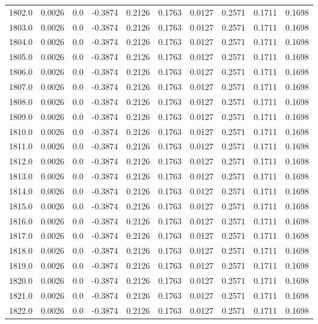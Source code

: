 \begin{longtable}{lrrrrrrrrr}
1802.0 & 0.0026 & 0.0 & -0.3874 & 0.2126 & 0.1763 & 0.0127 & 0.2571 & 0.1711 & 0.1698 \\
1803.0 & 0.0026 & 0.0 & -0.3874 & 0.2126 & 0.1763 & 0.0127 & 0.2571 & 0.1711 & 0.1698 \\
1804.0 & 0.0026 & 0.0 & -0.3874 & 0.2126 & 0.1763 & 0.0127 & 0.2571 & 0.1711 & 0.1698 \\
1805.0 & 0.0026 & 0.0 & -0.3874 & 0.2126 & 0.1763 & 0.0127 & 0.2571 & 0.1711 & 0.1698 \\
1806.0 & 0.0026 & 0.0 & -0.3874 & 0.2126 & 0.1763 & 0.0127 & 0.2571 & 0.1711 & 0.1698 \\
1807.0 & 0.0026 & 0.0 & -0.3874 & 0.2126 & 0.1763 & 0.0127 & 0.2571 & 0.1711 & 0.1698 \\
1808.0 & 0.0026 & 0.0 & -0.3874 & 0.2126 & 0.1763 & 0.0127 & 0.2571 & 0.1711 & 0.1698 \\
1809.0 & 0.0026 & 0.0 & -0.3874 & 0.2126 & 0.1763 & 0.0127 & 0.2571 & 0.1711 & 0.1698 \\
1810.0 & 0.0026 & 0.0 & -0.3874 & 0.2126 & 0.1763 & 0.0127 & 0.2571 & 0.1711 & 0.1698 \\
1811.0 & 0.0026 & 0.0 & -0.3874 & 0.2126 & 0.1763 & 0.0127 & 0.2571 & 0.1711 & 0.1698 \\
1812.0 & 0.0026 & 0.0 & -0.3874 & 0.2126 & 0.1763 & 0.0127 & 0.2571 & 0.1711 & 0.1698 \\
1813.0 & 0.0026 & 0.0 & -0.3874 & 0.2126 & 0.1763 & 0.0127 & 0.2571 & 0.1711 & 0.1698 \\
1814.0 & 0.0026 & 0.0 & -0.3874 & 0.2126 & 0.1763 & 0.0127 & 0.2571 & 0.1711 & 0.1698 \\
1815.0 & 0.0026 & 0.0 & -0.3874 & 0.2126 & 0.1763 & 0.0127 & 0.2571 & 0.1711 & 0.1698 \\
1816.0 & 0.0026 & 0.0 & -0.3874 & 0.2126 & 0.1763 & 0.0127 & 0.2571 & 0.1711 & 0.1698 \\
1817.0 & 0.0026 & 0.0 & -0.3874 & 0.2126 & 0.1763 & 0.0127 & 0.2571 & 0.1711 & 0.1698 \\
1818.0 & 0.0026 & 0.0 & -0.3874 & 0.2126 & 0.1763 & 0.0127 & 0.2571 & 0.1711 & 0.1698 \\
1819.0 & 0.0026 & 0.0 & -0.3874 & 0.2126 & 0.1763 & 0.0127 & 0.2571 & 0.1711 & 0.1698 \\
1820.0 & 0.0026 & 0.0 & -0.3874 & 0.2126 & 0.1763 & 0.0127 & 0.2571 & 0.1711 & 0.1698 \\
1821.0 & 0.0026 & 0.0 & -0.3874 & 0.2126 & 0.1763 & 0.0127 & 0.2571 & 0.1711 & 0.1698 \\
1822.0 & 0.0026 & 0.0 & -0.3874 & 0.2126 & 0.1763 & 0.0127 & 0.2571 & 0.1711 & 0.1698 \\

\end{longtable}
